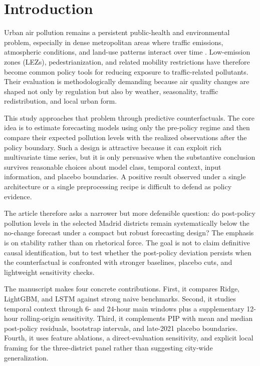 \section{Introduction}\label{sec:introduction}

Urban air pollution remains a persistent public-health and environmental problem, especially in dense metropolitan areas where traffic emissions, atmospheric conditions, and land-use patterns interact over time \cite{Dominski2021}. Low-emission zones (LEZs), pedestrianization, and related mobility restrictions have therefore become common policy tools for reducing exposure to traffic-related pollutants. Their evaluation is methodologically demanding because air quality changes are shaped not only by regulation but also by weather, seasonality, traffic redistribution, and local urban form.

This study approaches that problem through predictive counterfactuals. The core idea is to estimate forecasting models using only the pre-policy regime and then compare their expected pollution levels with the realized observations after the policy boundary. Such a design is attractive because it can exploit rich multivariate time series, but it is only persuasive when the substantive conclusion survives reasonable choices about model class, temporal context, input information, and placebo boundaries. A positive result observed under a single architecture or a single preprocessing recipe is difficult to defend as policy evidence.

The article therefore asks a narrower but more defensible question: do post-policy pollution levels in the selected Madrid districts remain systematically below the no-change forecast under a compact but robust forecasting design? The emphasis is on stability rather than on rhetorical force. The goal is not to claim definitive causal identification, but to test whether the post-policy deviation persists when the counterfactual is confronted with stronger baselines, placebo cuts, and lightweight sensitivity checks.

The manuscript makes four concrete contributions. First, it compares Ridge, LightGBM, and LSTM against strong naive benchmarks. Second, it studies temporal context through 6- and 24-hour main windows plus a supplementary 12-hour rolling-origin sensitivity. Third, it complements PIP with mean and median post-policy residuals, bootstrap intervals, and late-2021 placebo boundaries. Fourth, it uses feature ablations, a direct-evaluation sensitivity, and explicit local framing for the three-district panel rather than suggesting city-wide generalization.
